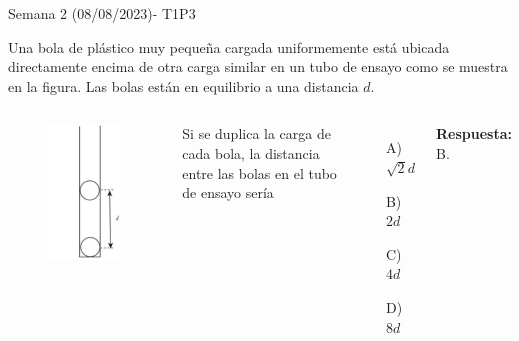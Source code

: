 \begin{frame}{Semana 2 (08/08/2023)- T1P3}
    
    Una bola de plástico muy pequeña cargada uniformemente está ubicada directamente encima de otra carga similar en un tubo de ensayo como se muestra en la figura. Las bolas están en equilibrio a una distancia $d$.
    
    \begin{columns}
     \begin{figure}
        \centering
        \includegraphics[scale=0.3]{figures/p2.png}
    \end{figure}
    

Si se duplica la carga de cada bola, la distancia entre las bolas en el tubo de ensayo sería
    
     \begin{itemize}
        \item[A)] $\sqrt{2}d$
        \item[B)] $2d$
        \item[C)] $4d$
        \item[D)] $8d$
    \end{itemize}
    
    \pause\bigskip\centering\textbf{Respuesta:} B.

    \end{columns}
    
\end{frame}

